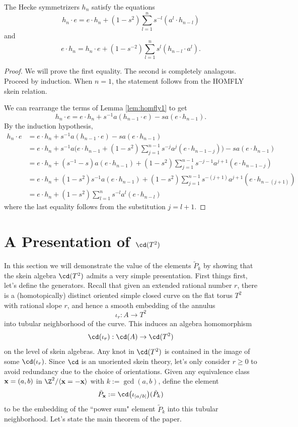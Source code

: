 \begin{theorem} \label{prop:homfly2}
The Hecke symmetrizers $h_n$ satisfy the equations
\[
h_n \cdot e = e \cdot h_n + ( 1 - s^2 ) \sum_{l=1}^{n} s^{-l} ( a^l \cdot h_{n-l} )
\]
and
\[
e \cdot h_n = h_n \cdot e + (1 - s^{-2} ) \sum_{l=1}^{n} s^l ( h_{n-l} \cdot a^l ).
\]
\end{theorem}
\begin{proof}
We will prove the first equality. The second is completely analagous. Proceed by induction. When $n=1$, the statement follows from the HOMFLY skein relation. 

We can rearrange the terms of Lemma \ref{lem:homfly1} to get
\begin{equation} \label{eq:homfly1b}
h_n \cdot e = e \cdot h_n + s^{-1} a ( h_{n-1} \cdot e ) - s a ( e \cdot h_{n-1} ).
\end{equation}
By the induction hypothesis,
\begin{align*}
h_n \cdot e & = e \cdot h_n + s^{-1} a ( h_{n-1} \cdot e ) - s a ( e \cdot h_{n-1} ) \\
& = e \cdot h_n + s^{-1} a \Big( e \cdot h_{n-1} + ( 1 - s^2 ) \sum_{j=1}^{n-1} s^{-j} a^j ( e \cdot h_{n-1-j} ) \Big) - s a ( e \cdot h_{n-1} ) \\
& = e \cdot h_n + ( s^{-1} - s ) a ( e \cdot h_{n-1} ) + ( 1 - s^2 ) \sum_{j=1}^{n-1} s^{-j-1} a^{j+1} ( e \cdot h_{n-1-j} ) \\ 
& = e \cdot h_n + ( 1 - s^2 ) s^{-1} a ( e \cdot h_{n-1} ) + ( 1 - s^2 ) \sum_{j=1}^{n-1} s^{-(j+1)} a^{j+1} ( e \cdot h_{n-(j+1)} ) \\
&= e \cdot h_n + ( 1 - s^2 ) \sum_{l=1}^{n} s^{-l} a^{l} ( e \cdot h_{n-l} )
\end{align*}
where the last equality follows from the substitution $j=l+1$. 
\end{proof}


\section{A Presentation of $\cd(T^2)$}

In this section we will demonstrate the value of the elements $\tilde{P}_k$  by showing that the skein algebra $\cd(T^2)$ admits a very simple presentation. First things first, let's define the generators. Recall that given an extended rational number $r$, there is a (homotopically) distinct oriented simple closed curve on the flat torus $T^2$ with rational slope $r$, and hence a smooth embedding of the annulus 
\[
\iota_r: A \to T^2
\]
into tubular neighborhood of the curve. This induces an algebra homomorphism
\[
\cd(\iota_r): \cd(A) \to \cd(T^2)
\]
on the level of skein algebras. Any knot in $\cd(T^2)$ is contained in the image of some $\cd(\iota_r)$. Since $\cd$ is an unoriented skein theory, let's only consider $r \geq 0$ to avoid redundancy due to the choice of orientations. Given any equivalence class ${\mathbf{x}} = (a, b)$ in $\Z^2 / \langle \xx = - \xx \rangle$ with $k := \gcd(a, b)$, define the element
\[
\tilde{P}_\xx := \cd\big(\iota_{|a/b|}\big)(\tilde{P}_k)
\]
to be the embedding of the ``power sum" element $\tilde{P}_k$ into this tubular neighborhood. Let's state the main theorem of the paper.

